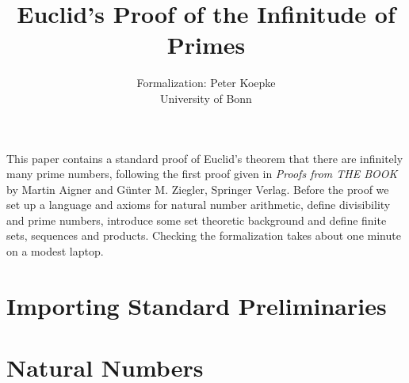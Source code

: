 \documentclass[11pt]{article}
\author{\Naproche{} Formalization: Peter Koepke\\
University of Bonn}
\title{Euclid's Proof
of the Infinitude of Primes}
\begin{document}
\newcommand{\Prod}[3]{#1_{#2} \cdots #1_{#3}}
\newcommand{\Seq}[2]{\{#1,\dots,#2\}}
\newcommand{\FinSet}[3]{\{#1_{#2},\dots,#1_{#3}\}}
\newcommand{\Primes}{\mathbb{P}}

\maketitle

This paper contains a standard proof of Euclid's theorem
that there are infinitely many prime numbers,
following the first proof given in \emph{Proofs from THE BOOK}
by Martin Aigner and Günter M. Ziegler, Springer Verlag.
Before the proof we
set up a language and axioms for natural number arithmetic,
define divisibility and prime numbers,
introduce some set theoretic background and define
finite sets, sequences and products.
Checking the formalization takes about one minute on a modest
laptop.


\section{Importing Standard Preliminaries}

\begin{forthel}
\end{forthel}


\section{Natural Numbers}
\end{document}
